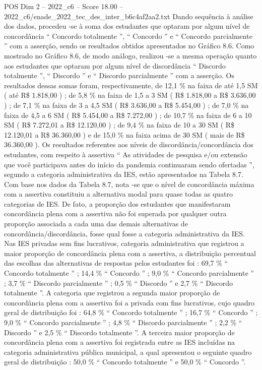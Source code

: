 \begin{textsample}{POS Dim 2 – 2022\_c6 – Score 18.00 – 2022\_c6/enade\_2022\_tec\_des\_inter\_b6c4af2aa2.txt}
Dando sequência à análise dos dados, procedeu -se à soma dos estudantes que optaram por algum nível de concordância “ Concordo totalmente ”, “ Concordo ” e “ Concordo parcialmente ” com a asserção, sendo os resultados obtidos apresentados no Gráfico 8.6.
Como mostrado no Gráfico 8.6, de modo análogo, realizou -se a mesma operação quanto aos estudantes que optaram por algum nível de discordância “ Discordo totalmente ”, “ Discordo ” e “ Discordo parcialmente ” com a asserção.
Os resultados dessas somas foram, respectivamente, de 12,1 \% na faixa de até 1,5 SM ( até R\$ 1.818,00 ) ; de 5,8 \% na faixa de 1,5 a 3 SM ( R\$ 1.818,00 a R\$ 3.636,00 ) ; de 7,1 \% na faixa de 3 a 4,5 SM ( R\$ 3.636,00 a R\$ 5.454,00 ) ; de 7,0 \% na faixa de 4,5 a 6 SM ( R\$ 5.454,00 a R\$ 7.272,00 ) ; de 10,7 \% na faixa de 6 a 10 SM ( R\$ 7.272,01 a R\$ 12.120,00 ) ; de 9,4 \% na faixa de 10 a 30 SM ( R\$ 12.120,01 a R\$ 36.360,00 ) e de 15,0 \% na faixa acima de 30 SM ( mais de R\$ 36.360,00 ).
Os resultados referentes aos níveis de discordância/concordância dos estudantes, com respeito à assertiva “ As atividades de pesquisa e/ou extensão que você participava antes do início da pandemia continuaram sendo ofertadas ”, segundo a categoria administrativa da IES, estão apresentados na Tabela 8.7.
Com base nos dados da Tabela 8.7, nota -se que o nível de concordância máxima com a assertiva constituiu a alternativa modal para quase todas as quatro categorias de IES.
De fato, a proporção dos estudantes que manifestaram concordância plena com a assertiva não foi superada por qualquer outra proporção associada a cada uma das demais alternativas de concordância/discordância, fosse qual fosse a categoria administrativa da IES.
Nas IES privadas sem fins lucrativos, categoria administrativa que registrou a maior proporção de concordância plena com a assertiva, a distribuição percentual das escolhas das alternativas de respostas pelos estudantes foi : 69,7 \% “ Concordo totalmente ” ; 14,4 \% “ Concordo ” ; 9,0 \% “ Concordo parcialmente ” ; 3,7 \% “ Discordo parcialmente ” ; 0,5 \% “ Discordo ” e 2,7 \% “ Discordo totalmente ”.
A categoria que registrou a segunda maior proporção de concordância plena com a assertiva foi a privada com fins lucrativos, cujo quadro geral de distribuição foi : 64,8 \% “ Concordo totalmente ” ; 16,7 \% “ Concordo ” ; 9,0 \% “ Concordo parcialmente ” ; 4,8 \% “ Discordo parcialmente ” ; 2,2 \% “ Discordo ” e 2,5 \% “ Discordo totalmente ”.
A terceira maior proporção de concordância plena com a assertiva foi registrada entre as IES incluídas na categoria administrativa pública municipal, a qual apresentou o seguinte quadro geral de distribuição : 50,0 \% “ Concordo totalmente ” e 50,0 \% “ Concordo ”.

\end{textsample}
